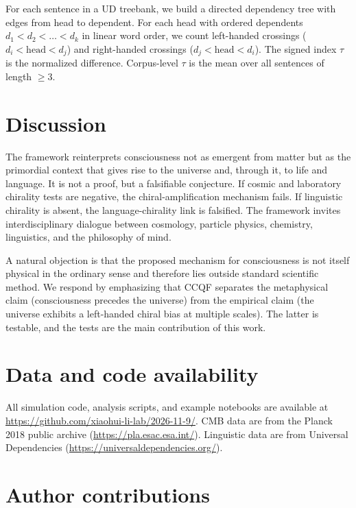 \documentclass[twocolumn,11pt,a4paper]{article}
\begin{document}
For each sentence in a UD treebank, we build a directed dependency tree with edges from head to dependent. For each head with ordered dependents $d_1 < d_2 < \dots < d_k$ in linear word order, we count left-handed crossings ($d_i < \mathrm{head} < d_j$) and right-handed crossings ($d_j < \mathrm{head} < d_i$). The signed index $\tau$ is the normalized difference. Corpus-level $\tau$ is the mean over all sentences of length $\ge 3$.

\section{Discussion}
\label{sec:discussion}

The framework reinterprets consciousness not as emergent from matter but as the primordial context that gives rise to the universe and, through it, to life and language. It is not a proof, but a falsifiable conjecture. If cosmic and laboratory chirality tests are negative, the chiral-amplification mechanism fails. If linguistic chirality is absent, the language-chirality link is falsified. The framework invites interdisciplinary dialogue between cosmology, particle physics, chemistry, linguistics, and the philosophy of mind.

A natural objection is that the proposed mechanism for consciousness is not itself physical in the ordinary sense and therefore lies outside standard scientific method. We respond by emphasizing that CCQF separates the metaphysical claim (consciousness precedes the universe) from the empirical claim (the universe exhibits a left-handed chiral bias at multiple scales). The latter is testable, and the tests are the main contribution of this work.

\section*{Data and code availability}

All simulation code, analysis scripts, and example notebooks are available at \url{https://github.com/xiaohui-li-lab/2026-11-9/}. CMB data are from the Planck 2018 public archive (\url{https://pla.esac.esa.int/}). Linguistic data are from Universal Dependencies (\url{https://universaldependencies.org/}).

\section*{Author contributions}
\end{document}

